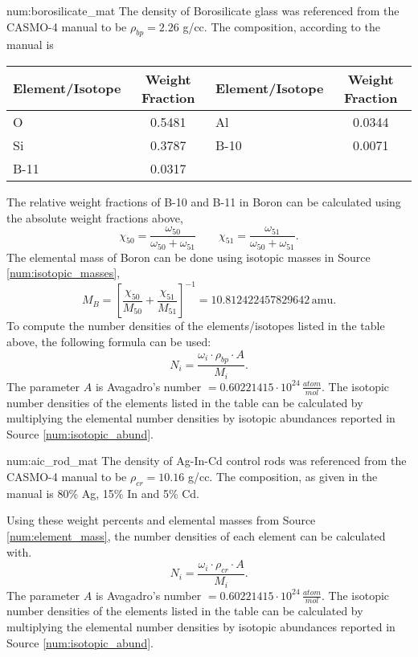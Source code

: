 \begin{numitem}{num:borosilicate_mat}
   The density of Borosilicate glass was referenced from the CASMO-4 manual to be $\rho_{bp} = 2.26$ g/cc.  The composition, according to the manual is
 \begin{center}
  \begin{tabular}{l c l c}
    \toprule
    Element/Isotope & Weight Fraction & Element/Isotope & Weight Fraction \\
    \midrule
    \midrule
 O   &  0.5481   &  Al  &   0.0344 \\
Si   &  0.3787 &  B-10  &   0.0071   \\
B-11   &  0.0317 &   &    \\
    \bottomrule
  \end{tabular}
 \end{center}
The relative weight fractions of B-10 and B-11 in Boron can be calculated using the absolute weight fractions above,
\[
    \chi_{50} = \frac{\omega_{50}}{\omega_{50} + \omega_{51}} \qquad \chi_{51} = \frac{\omega_{51}}{\omega_{50} + \omega_{51}}.
\]
The elemental mass of Boron can be done using isotopic masses in Source \ref{num:isotopic_masses},
\[
    M_{B} = \left[ \frac{\chi_{50}}{M_{50}} + \frac{\chi_{51}}{M_{51}} \right]^{-1} = 10.812422457829642\,\mathrm{amu}.
\]
To compute the number densities of the elements/isotopes listed in the table above, the following formula can be used:
\[
    N_i = \frac{\omega_i\cdot\rho_{bp}\cdot A}{M_i}.
\]
The parameter $A$ is Avagadro's number $=0.60221415\cdot 10^{24}\,\frac{atom}{mol}$. The isotopic number densities of the elements listed in the table can be calculated by multiplying the elemental number densities by isotopic abundances reported in Source \ref{num:isotopic_abund}.


\end{numitem}

\begin{numitem}{num:aic_rod_mat}
   The density of Ag-In-Cd control rods was referenced from the CASMO-4 manual to be $\rho_{cr} = 10.16$ g/cc.  The composition, as given in the manual is 80\% Ag, 15\% In and 5\% Cd.

Using these weight percents and elemental masses from Source \ref{num:element_mass}, the number densities of each element can be calculated with.
\[
    N_i = \frac{\omega_i\cdot\rho_{cr}\cdot A}{M_i}.
\]
The parameter $A$ is Avagadro's number $=0.60221415\cdot 10^{24}\,\frac{atom}{mol}$. The isotopic number densities of the elements listed in the table can be calculated by multiplying the elemental number densities by isotopic abundances reported in Source \ref{num:isotopic_abund}.


\end{numitem}


